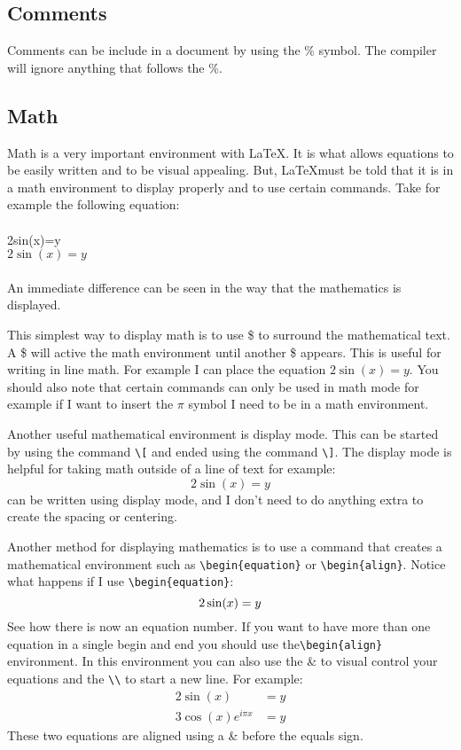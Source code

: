 \documentclass{article} 	%
\numberwithin{equation}{section}
\begin{document}
		\subsection{Comments}
		Comments can be include in a document by using the \% symbol.  The compiler will ignore anything that follows the \%.

		\subsection{Math}
		Math is a very important environment with \LaTeX.  It is what allows equations to be easily written and to be visual appealing.  But, \LaTeX must be told that it is in a math environment to display properly and to use certain commands.  Take for example the following equation:\\
		\\
		2sin(x)=y \\
		$2\sin(x)=y$\\
		\\
		An immediate difference can be seen in the way that the mathematics is displayed.

		This simplest way to display math is to use \$ to surround the mathematical text.  A \$ will active the math environment until another \$ appears.  This is useful for writing in line math.  For example I can place the equation $2\sin(x)=y$.  You should also note that certain commands can only be used in math mode for example if I want to insert the $\pi$ symbol I need to be in a math environment.

		Another useful mathematical environment is display mode.  This can be started by using the command \verb|\[| and ended using the command \verb|\]|.  The display mode is helpful for taking math outside of a line of text for example: \[2\sin(x)=y\] can be written using display mode, and I don't need to do anything extra to create the spacing or centering.

		Another method for displaying mathematics is to use a command that creates a mathematical environment such as \verb|\begin{equation}| or \verb|\begin{align}|.  Notice what happens if I use \verb|\begin{equation}|:
		\begin{equation}
			2\sin(x)=y \\
		\end{equation}
		See how there is now an equation number.  If you want to have more than one equation in a single begin and end you should use the\verb|\begin{align}| environment.  In this environment you can also use the \& to visual control your equations and the \verb|\\| to start a new line.  For example:
		\begin{align}
			2\sin(x)&=y \\
			3\cos(x)e^{i\pi x}&=y
		\end{align}
		These two equations are aligned using a \& before the equals sign.
\end{document}

